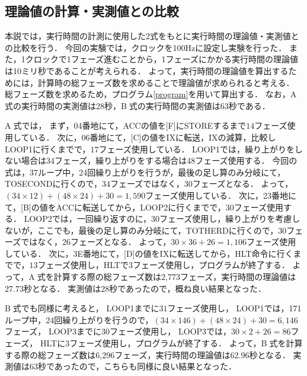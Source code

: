 \documentclass[dvipdfmx]{jsarticle}
\begin{document}
\subsection{理論値の計算・実測値との比較}
本説では，実行時間の計測に使用した2式をもとに実行時間の理論値・実測値との比較を行う．
今回の実験では，クロックを100Hzに設定し実験を行った．
また，1クロックで1フェーズ進むことから，1フェーズにかかる実行時間の理論値は10ミリ秒であることが考えられる．
よって，実行時間の理論値を算出するためには，計算時の総フェーズ数を求めることで理論値が求められると考える．
総フェーズ数を求めるため，プログラム\ref{program}を用いて算出する．
なお，\textcircled{\scriptsize A}式の実行時間の実測値は28秒，\textcircled{\scriptsize B}式の実行時間の実測値は63秒である．

\textcircled{\scriptsize A}式では，
まず，04番地にて，ACCの値を[F]にSTOREするまで$14$フェーズ使用している．
次に，06番地にて，[C]の値をIXに転送，IXの減算，比較しLOOP1に行くまでで，$17$フェーズ使用している．
LOOP1では，繰り上がりをしない場合は34フェーズ，繰り上がりをする場合は48フェーズ使用する．
今回の式は，37ループ中，24回繰り上がりを行うが，最後の足し算のみ分岐にて，TOSECONDに行くので，34フェーズではなく，30フェーズとなる．
よって，$(34\times12) + (48\times24) + 30 = 1,590$フェーズ使用している．
次に，23番地にて，[B]の値をACCに転送してから，LOOP2に行くまでで，$30$フェーズ使用する．
LOOP2では，一回繰り返すのに，30フェーズ使用し，繰り上がりを考慮しないが，ここでも，最後の足し算のみ分岐にて，TOTHERDに行くので，30フェーズではなく，26フェーズとなる．
よって，$30\times36 + 26 = 1,106$フェーズ使用している．
次に，3E番地にて，[D]の値をIXに転送してから，HLT命令に行くまでで，$13$フェーズ使用し，HLTで$3$フェーズ使用し，プログラムが終了する．
よって，\textcircled{\scriptsize A}式を計算する際の総フェーズ数は2,773フェーズ，実行時間の理論値は27.73秒となる．
実測値は28秒であったので，概ね良い結果となった．

\textcircled{\scriptsize B}式でも同様に考えると，
LOOP1までに$31$フェーズ使用し，
LOOP1では，171ループ中，24回繰り上がりを行うので，$(34\times146) + (48\times24) + 30 = 6,146$フェーズ，
LOOP3までに$30$フェーズ使用し，
LOOP3では，$30\times2 + 26 = 86$フェーズ，
HLTに$3$フェーズ使用し，プログラムが終了する．
よって，\textcircled{\scriptsize B}式を計算する際の総フェーズ数は6,296フェーズ，実行時間の理論値は62.96秒となる．
実測値は63秒であったので，こちらも同様に良い結果となった．
\end{document}

